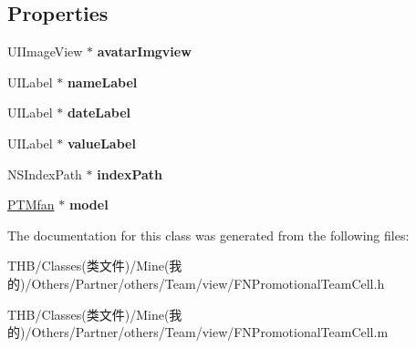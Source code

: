 \subsection*{Properties}
\begin{DoxyCompactItemize}
\item 
\mbox{\label{interface_f_n_promotional_team_cell_a01b2db9cdf376e44908f2972a9111d5f}} 
U\+I\+Image\+View $\ast$ {\bfseries avatar\+Imgview}
\item 
\mbox{\label{interface_f_n_promotional_team_cell_a64cec6e355c0e250cdf12c781e203b3e}} 
U\+I\+Label $\ast$ {\bfseries name\+Label}
\item 
\mbox{\label{interface_f_n_promotional_team_cell_a4b88c846798de45bcc481679e6ff0468}} 
U\+I\+Label $\ast$ {\bfseries date\+Label}
\item 
\mbox{\label{interface_f_n_promotional_team_cell_ab2a329364a9314ebe359f7d438b8481e}} 
U\+I\+Label $\ast$ {\bfseries value\+Label}
\item 
\mbox{\label{interface_f_n_promotional_team_cell_a7fed629891025c58252dd0d023320d87}} 
N\+S\+Index\+Path $\ast$ {\bfseries index\+Path}
\item 
\mbox{\label{interface_f_n_promotional_team_cell_afd1e2220b48b2bdad69990a3dac48a6a}} 
\mbox{\hyperlink{interface_p_t_mfan}{P\+T\+Mfan}} $\ast$ {\bfseries model}
\end{DoxyCompactItemize}


The documentation for this class was generated from the following files\+:\begin{DoxyCompactItemize}
\item 
T\+H\+B/\+Classes(类文件)/\+Mine(我的)/\+Others/\+Partner/others/\+Team/view/F\+N\+Promotional\+Team\+Cell.\+h\item 
T\+H\+B/\+Classes(类文件)/\+Mine(我的)/\+Others/\+Partner/others/\+Team/view/F\+N\+Promotional\+Team\+Cell.\+m\end{DoxyCompactItemize}
